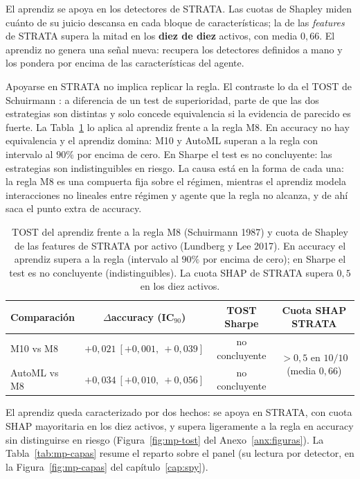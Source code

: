 El aprendiz se apoya en los detectores de STRATA. Las cuotas de Shapley \cite{lundberg2017} miden cuánto de su juicio descansa en cada bloque de características; la de las \emph{features} de STRATA supera la mitad en los \textbf{diez de diez} activos, con media $0{,}66$. El aprendiz no genera una señal nueva: recupera los detectores definidos a mano y los pondera por encima de las características del agente.

Apoyarse en STRATA no implica replicar la regla. El contraste lo da el TOST de Schuirmann \cite{schuirmann1987}: a diferencia de un test de superioridad, parte de que las dos estrategias son distintas y solo concede equivalencia si la evidencia de parecido es fuerte. La Tabla~\ref{tab:mp-tost} lo aplica al aprendiz frente a la regla M8. En accuracy no hay equivalencia y el aprendiz domina: M10 y AutoML superan a la regla con intervalo al $90\%$ por encima de cero. En Sharpe el test es no concluyente: las estrategias son indistinguibles en riesgo. La causa está en la forma de cada una: la regla M8 es una compuerta fija sobre el régimen, mientras el aprendiz modela interacciones no lineales entre régimen y agente que la regla no alcanza, y de ahí saca el punto extra de accuracy.

\begin{table}[htbp]
\centering
\caption{TOST del aprendiz frente a la regla M8 (Schuirmann 1987) y cuota de Shapley de las features de STRATA por activo (Lundberg y Lee 2017). En accuracy el aprendiz supera a la regla (intervalo al $90\%$ por encima de cero); en Sharpe el test es no concluyente (indistinguibles). La cuota SHAP de STRATA supera $0{,}5$ en los diez activos.}
\label{tab:mp-tost}
\begin{tabular}{lccc}
\toprule
Comparación & $\Delta$accuracy (IC$_{90}$) & TOST Sharpe & Cuota SHAP STRATA \\
\midrule
M10 vs M8     & $+0{,}021\ [+0{,}001,\ +0{,}039]$ & no concluyente & \multirow{2}{*}{$>0{,}5$ en $10/10$ (media $0{,}66$)} \\
AutoML vs M8  & $+0{,}034\ [+0{,}010,\ +0{,}056]$ & no concluyente & \\
\bottomrule
\end{tabular}
\end{table}

El aprendiz queda caracterizado por dos hechos: se apoya en STRATA, con cuota SHAP mayoritaria en los diez activos, y supera ligeramente a la regla en accuracy sin distinguirse en riesgo (Figura~\ref{fig:mp-tost} del Anexo~\ref{anx:figuras}). La Tabla~\ref{tab:mp-capas} resume el reparto sobre el panel (su lectura por detector, en la Figura~\ref{fig:mp-capas} del capítulo~\ref{cap:spy}).

